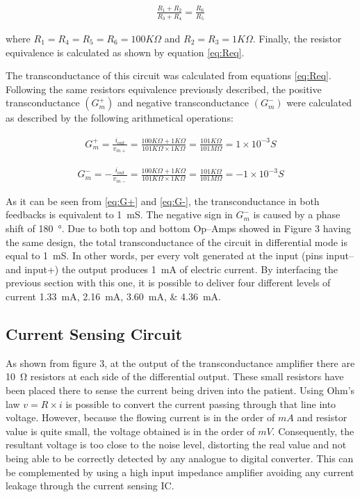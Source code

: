 \begin{align}
\label{eq:Req}
\frac{R_1 + R_2}{R_3 + R_4} = \frac{R_6}{R_5}
\end{align}

where $R_1=R_4=R_5=R_6=100K\Omega$ and $R_2=R_3=1K\Omega$. Finally, the resistor equivalence is calculated as shown by equation \ref{eq:Req}. 

The transconductance of this circuit was calculated from equations \ref{eq:Req}. Following the same resistors equivalence previously described, the positive  transconductance $(G^+_m)$ and negative transconductance $(G^-_m)$ were calculated as described by the following arithmetical operations:


\begin{align}
\label{eq:G+}
G^+_m=\frac{i_{out}}{v_{in+}}=\frac{100K\Omega + 1K\Omega}{101K\Omega \times 1K\Omega}=\frac{101K\Omega}{101M\Omega}=1\times10^{-3}S 
\end{align}

\begin{align}
\label{eq:G-}
G^-_m=-\frac{i_{out}}{v_{in-}}=\frac{100K\Omega + 1K\Omega}{101K\Omega \times 1K\Omega}=\frac{101K\Omega}{101M\Omega}=-1\times10^{-3}S 
\end{align}

As it can be seen from \ref{eq:G+} and \ref{eq:G-}, the transconductance in both feedbacks is equivalent to \SI{1}{\milli\siemens}. The negative sign in $G^{-}_m$ is caused by a phase shift of \SI{180}{\degree}. Due to both top and bottom Op–Amps showed in Figure 3 having the same design, the total transconductance of the circuit in differential mode is equal to \SI{1}{\milli\siemens}. In other words, per every volt generated at the input (pins input– and input+) the output produces \SI{1}{\mA} of electric current. By interfacing the previous section with this one, it is possible to deliver four different levels of current \SIlist{1.33;2.16;3.60;4.36}{\mA}.

\subsection{Current Sensing Circuit}
As shown from figure 3, at the output of the transconductance amplifier there are \SI{10}{\ohm} resistors at each side of the differential output. These small resistors have been placed there to sense the current being driven into the patient. Using Ohm's law $v=R \times i$ is possible to convert the current passing through that line into voltage. However, because the flowing current is in the order of $mA$ and resistor value is quite small, the voltage obtained is in the order of $mV$. Consequently, the resultant voltage is too close to the noise level, distorting the real value and not being able to be correctly detected by any analogue to digital converter. This can be complemented by using a high input impedance amplifier avoiding any current leakage through the current sensing IC.  

